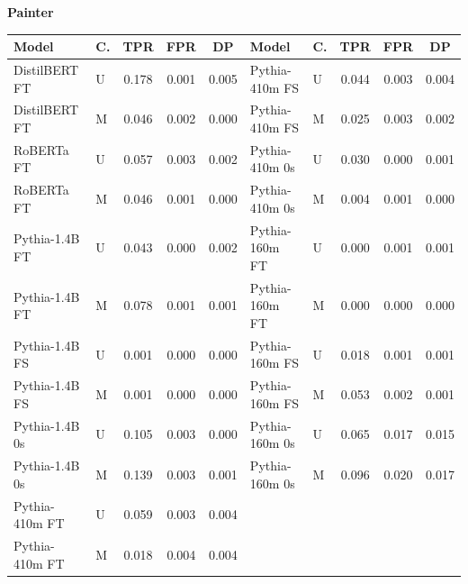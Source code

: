 \documentclass[11pt]{article}
\begin{document}
\vspace{4pt}\noindent\textbf{Painter}
\begin{center}\scriptsize
\begin{tabular}{llccc|llccc}
\toprule
\textbf{Model} & \textbf{C.} & \textbf{TPR} & \textbf{FPR} & \textbf{DP} & \textbf{Model} & \textbf{C.} & \textbf{TPR} & \textbf{FPR} & \textbf{DP} \\
\midrule
DistilBERT FT & U & 0.178 & 0.001 & 0.005 & Pythia-410m FS & U & 0.044 & 0.003 & 0.004 \\
DistilBERT FT & M & 0.046 & 0.002 & 0.000 & Pythia-410m FS & M & 0.025 & 0.003 & 0.002 \\
RoBERTa FT & U & 0.057 & 0.003 & 0.002 & Pythia-410m 0s & U & 0.030 & 0.000 & 0.001 \\
RoBERTa FT & M & 0.046 & 0.001 & 0.000 & Pythia-410m 0s & M & 0.004 & 0.001 & 0.000 \\
Pythia-1.4B FT & U & 0.043 & 0.000 & 0.002 & Pythia-160m FT & U & 0.000 & 0.001 & 0.001 \\
Pythia-1.4B FT & M & 0.078 & 0.001 & 0.001 & Pythia-160m FT & M & 0.000 & 0.000 & 0.000 \\
Pythia-1.4B FS & U & 0.001 & 0.000 & 0.000 & Pythia-160m FS & U & 0.018 & 0.001 & 0.001 \\
Pythia-1.4B FS & M & 0.001 & 0.000 & 0.000 & Pythia-160m FS & M & 0.053 & 0.002 & 0.001 \\
Pythia-1.4B 0s & U & 0.105 & 0.003 & 0.000 & Pythia-160m 0s & U & 0.065 & 0.017 & 0.015 \\
Pythia-1.4B 0s & M & 0.139 & 0.003 & 0.001 & Pythia-160m 0s & M & 0.096 & 0.020 & 0.017 \\
Pythia-410m FT & U & 0.059 & 0.003 & 0.004 & & & & & \\
Pythia-410m FT & M & 0.018 & 0.004 & 0.004 & & & & & \\
\bottomrule
\end{tabular}
\end{center}
\end{document}
